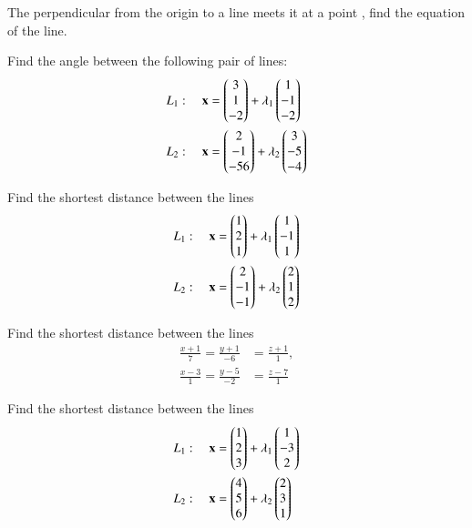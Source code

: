 \item The perpendicular from the origin to a line meets it at a point , find the equation of the line.
\item Find the angle between the following pair of lines:
\begin{align}
L_1: \quad \mathbf{x} &= \begin{pmatrix}3\\1\\-2\end{pmatrix} + \lambda_1\begin{pmatrix}1 \\ -1 \\-2\end{pmatrix}
\\
L_2: \quad \mathbf{x} &= \begin{pmatrix}2\\-1\\-56\end{pmatrix} + \lambda_2\begin{pmatrix}3 \\ -5 \\-4\end{pmatrix}
\end{align}
\item Find the shortest distance between the lines 
\begin{align}
L_1: \quad \mathbf{x} &= \begin{pmatrix}1\\2\\1\end{pmatrix} + \lambda_1\begin{pmatrix}1 \\ -1 \\1\end{pmatrix}
\\
L_2: \quad \mathbf{x} &= \begin{pmatrix}2\\-1\\-1\end{pmatrix} + \lambda_2\begin{pmatrix}2 \\ 1 \\2\end{pmatrix}
\end{align}
\solution

%
\item Find the shortest distance between the lines 
\begin{align}
\frac{x+1}{7} = \frac{y+1}{-6} &= \frac{z+1}{1}, 
\\
\frac{x-3}{1} = \frac{y-5}{-2} &= \frac{z-7}{1} 
\end{align}
%
\item Find the shortest distance between the lines 
\begin{align}
L_1: \quad \mathbf{x} &= \begin{pmatrix}1\\2\\3\end{pmatrix} + \lambda_1\begin{pmatrix}1 \\ -3 \\2\end{pmatrix}
\\
L_2: \quad \mathbf{x} &= \begin{pmatrix}4\\5\\6\end{pmatrix} + \lambda_2\begin{pmatrix}2 \\ 3 \\1\end{pmatrix}
\end{align}
